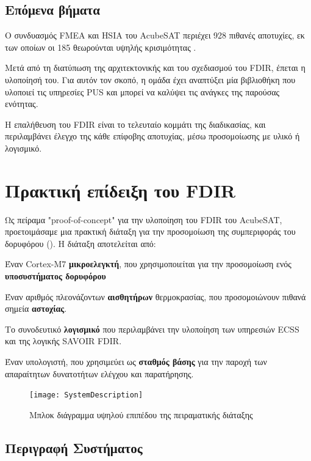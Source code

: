\documentclass[a4paper,nobib]{tufte-book}
\begin{document}
\section{Επόμενα βήματα}
Ο συνδυασμός \acs{FMEA} και \acs{HSIA} του AcubeSAT περιέχει 928 πιθανές αποτυχίες, εκ των οποίων οι 185 θεωρούνται υψηλής κρισιμότητας \parencite{retselis_acubesat_fmea_2020}.

Μετά από τη διατύπωση της αρχιτεκτονικής και του σχεδιασμού του \acs{FDIR}, έπεται η υλοποίησή του. Για αυτόν τον σκοπό, η ομάδα έχει αναπτύξει μία βιβλιοθήκη που υλοποιεί τις υπηρεσίες \acs{PUS} και μπορεί να καλύψει τις ανάγκες της παρούσας ενότητας.

Η επαλήθευση του \acs{FDIR} είναι το τελευταίο κομμάτι της διαδικασίας, και περιλαμβάνει έλεγχο της κάθε επίφοβης αποτυχίας, μέσω προσομοίωσης με υλικό ή λογισμικό.

\chapter{Πρακτική επίδειξη του \acs{FDIR}}
\label{cap:practical}

Ως πείραμα "proof-of-concept" για την υλοποίηση του \ac{FDIR} του AcubeSAT, προετοιμάσαμε μια πρακτική διάταξη για την προσομοίωση της συμπεριφοράς του δορυφόρου (). Η διάταξη αποτελείται από:
\begin{compactitem}
	\item Έναν Cortex-M7 \textbf{μικροελεγκτή}, που χρησιμοποιείται για την προσομοίωση ενός \textbf{υποσυστήματος δορυφόρου}
	\item Έναν αριθμός πλεονάζοντων \textbf{αισθητήρων} θερμοκρασίας, που προσομοιώνουν πιθανά σημεία \textbf{αστοχίας}.
	\item Το συνοδευτικό \textbf{λογισμικό} που περιλαμβάνει την υλοποίηση των υπηρεσιών \ac{ECSS} και της λογικής \ac{SAVOIR} \ac{FDIR}.
	\item Έναν υπολογιστή, που χρησιμεύει ως \textbf{σταθμός βάσης} για την παροχή των απαραίτητων δυνατοτήτων ελέγχου και παρατήρησης.
\end{compactitem}

\begin{figure}[h]
	\texttt{[image: SystemDescription]}
	\caption{Μπλοκ διάγραμμα υψηλού επιπέδου της πειραματικής διάταξης}
	\label{fig:block}
\end{figure}
\section{Περιγραφή Συστήματος}
\end{document}
